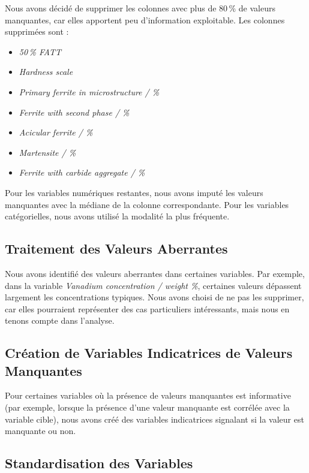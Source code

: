 \documentclass{article}
\begin{document}
Nous avons décidé de supprimer les colonnes avec plus de 80\,\% de valeurs manquantes, car elles apportent peu d'information exploitable. Les colonnes supprimées sont :

\begin{itemize}
    \item \textit{50\,\% FATT}
    \item \textit{Hardness scale}
    \item \textit{Primary ferrite in microstructure / \%}
    \item \textit{Ferrite with second phase / \%}
    \item \textit{Acicular ferrite / \%}
    \item \textit{Martensite / \%}
    \item \textit{Ferrite with carbide aggregate / \%}
\end{itemize}

Pour les variables numériques restantes, nous avons imputé les valeurs manquantes avec la médiane de la colonne correspondante. Pour les variables catégorielles, nous avons utilisé la modalité la plus fréquente.

\subsection{Traitement des Valeurs Aberrantes}

Nous avons identifié des valeurs aberrantes dans certaines variables. Par exemple, dans la variable \textit{Vanadium concentration / weight \%}, certaines valeurs dépassent largement les concentrations typiques. Nous avons choisi de ne pas les supprimer, car elles pourraient représenter des cas particuliers intéressants, mais nous en tenons compte dans l'analyse.

\subsection{Création de Variables Indicatrices de Valeurs Manquantes}

Pour certaines variables où la présence de valeurs manquantes est informative (par exemple, lorsque la présence d'une valeur manquante est corrélée avec la variable cible), nous avons créé des variables indicatrices signalant si la valeur est manquante ou non.

\subsection{Standardisation des Variables}
\end{document}
